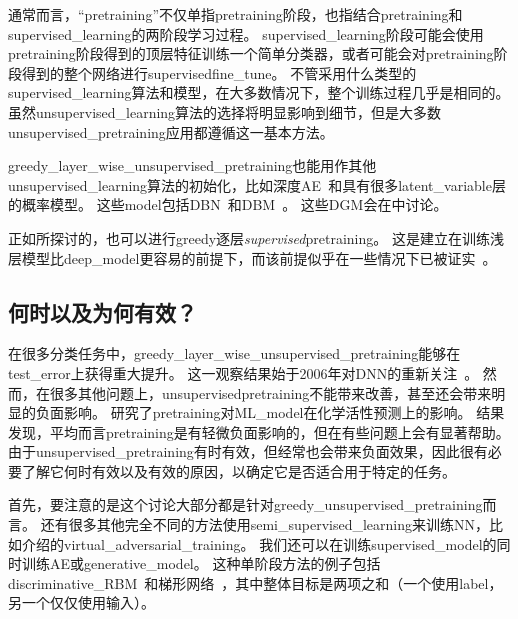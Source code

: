 
通常而言，``\gls{pretraining}''不仅单指\gls{pretraining}阶段，也指结合\gls{pretraining}和\gls{supervised_learning}的两阶段学习过程。
\gls{supervised_learning}阶段可能会使用\gls{pretraining}阶段得到的顶层特征训练一个简单分类器，或者可能会对\gls{pretraining}阶段得到的整个网络进行\gls{supervised}\gls{fine_tune}。
不管采用什么类型的\gls{supervised_learning}算法和模型，在大多数情况下，整个训练过程几乎是相同的。
虽然\gls{unsupervised_learning}算法的选择将明显影响到细节，但是大多数\gls{unsupervised_pretraining}应用都遵循这一基本方法。


\gls{greedy_layer_wise_unsupervised_pretraining}也能用作其他\gls{unsupervised_learning}算法的初始化，比如深度\gls{AE}~\citep{Hinton-Science2006}和具有很多\gls{latent_variable}层的概率模型。
这些\gls{model}包括\gls{DBN}~\citep{Hinton06-small}和\gls{DBM}~\citep{Salakhutdinov+Hinton-2009-small}。
这些\gls{DGM}会在中讨论。


正如所探讨的，也可以进行\gls{greedy}逐层\emph{\gls{supervised}}\gls{pretraining}。
这是建立在训练浅层模型比\gls{deep_model}更容易的前提下，而该前提似乎在一些情况下已被证实~\citep{Erhan+al-2010-small}。


\subsection{何时以及为何有效？}
\label{sec:when_and_why_does_unsupervised_pretraining_work}


在很多分类任务中，\gls{greedy_layer_wise_unsupervised_pretraining}能够在\gls{test_error}上获得重大提升。
这一观察结果始于2006年对\gls{DNN}的重新关注~\citep{Hinton06-small,Bengio-nips-2006,ranzato-07-small}。
然而，在很多其他问题上，\gls{unsupervised}\gls{pretraining}不能带来改善，甚至还会带来明显的负面影响。
\cite{Ma-et-al-2015}研究了\gls{pretraining}对\gls{ML_model}在化学活性预测上的影响。
结果发现，平均而言\gls{pretraining}是有轻微负面影响的，但在有些问题上会有显著帮助。
由于\gls{unsupervised_pretraining}有时有效，但经常也会带来负面效果，因此很有必要了解它何时有效以及有效的原因，以确定它是否适合用于特定的任务。



首先，要注意的是这个讨论大部分都是针对\gls{greedy_unsupervised_pretraining}而言。
还有很多其他完全不同的方法使用\gls{semi_supervised_learning}来训练\gls{NN}，比如介绍的\gls{virtual_adversarial_training}。
我们还可以在训练\gls{supervised_model}的同时训练\gls{AE}或\gls{generative_model}。
这种单阶段方法的例子包括\gls{discriminative_RBM}~\citep{Larochelle+Bengio-2008}和梯形网络~\citep{Rasmus-et-al-arxiv2015}，其中整体目标是两项之和（一个使用\gls{label}，另一个仅仅使用输入）。

